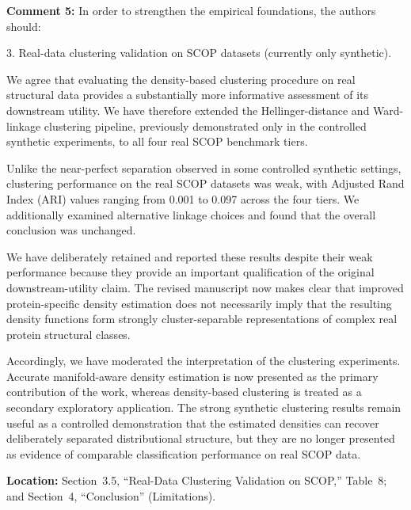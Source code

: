 \documentclass[a4paper,11pt]{article}
\newcommand{\reviewercomment}[2]{%
    \begin{reviewerscomment}
        \textbf{Comment #1:} #2
    \end{reviewerscomment}
}
\newcommand{\response}[1]{%
    \begin{myresponse}
        #1
    \end{myresponse}
    \vspace{5mm}
}
\begin{document}

\reviewercomment{5}{
In order to strengthen the empirical foundations, the authors should:

3. Real-data clustering validation on SCOP datasets (currently only synthetic).
}

\response{
We agree that evaluating the density-based clustering procedure on real
structural data provides a substantially more informative assessment of its
downstream utility. We have therefore extended the Hellinger-distance and
Ward-linkage clustering pipeline, previously demonstrated only in the
controlled synthetic experiments, to all four real SCOP benchmark tiers.

Unlike the near-perfect separation observed in some controlled synthetic
settings, clustering performance on the real SCOP datasets was weak, with
Adjusted Rand Index (ARI) values ranging from 0.001 to 0.097 across the four
tiers. We additionally examined alternative linkage choices and found that
the overall conclusion was unchanged.

We have deliberately retained and reported these results despite their weak
performance because they provide an important qualification of the original
downstream-utility claim. The revised manuscript now makes clear that improved
protein-specific density estimation does not necessarily imply that the
resulting density functions form strongly cluster-separable representations of
complex real protein structural classes.

Accordingly, we have moderated the interpretation of the clustering
experiments. Accurate manifold-aware density estimation is now presented as
the primary contribution of the work, whereas density-based clustering is
treated as a secondary exploratory application. The strong synthetic
clustering results remain useful as a controlled demonstration that the
estimated densities can recover deliberately separated distributional
structure, but they are no longer presented as evidence of comparable
classification performance on real SCOP data.

\textbf{Location:} Section~3.5, ``Real-Data Clustering Validation on SCOP,''
Table~8; and Section~4, ``Conclusion'' (Limitations).
}


\end{document}
